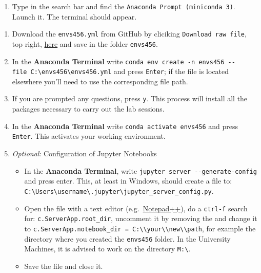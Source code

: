 \documentclass[
  letterpaper,
  DIV=11,
  numbers=noendperiod]{scrreprt}
\providecommand{\tightlist}{%
  \setlength{\itemsep}{0pt}\setlength{\parskip}{0pt}}\usepackage{longtable,booktabs,array}
\begin{document}
\begin{enumerate}
\def\labelenumi{\arabic{enumi}.}
\tightlist
\item
  Type in the search bar and find the
  \texttt{Anaconda\ Prompt\ (miniconda\ 3)}. Launch it. The terminal
  should appear.
\end{enumerate}

\begin{enumerate}
\def\labelenumi{\arabic{enumi}.}
\setcounter{enumi}{1}
\tightlist
\item
  Download the \texttt{envs456.yml} from GitHub by cliciking
  \texttt{Download\ raw\ file}, top right,
  \href{https://github.com/GDSL-UL/wma/blob/main/envs456.yml}{here} and
  save in the folder \texttt{envs456}.
\item
  In the \textbf{Anaconda Terminal} write
  \texttt{conda\ env\ create\ -n\ envs456\ -\/-file\ C:\textbackslash{}envs456\textbackslash{}envs456.yml}
  and press \texttt{Enter}; if the file is located elsewhere you'll need
  to use the corresponding file path.
\item
  If you are prompted any questions, press \texttt{y}. This process will
  install all the packages necessary to carry out the lab sessions.
\item
  In the \textbf{Anaconda Terminal} write
  \texttt{conda\ activate\ envs456} and press \texttt{Enter}. This
  activates your working environment.
\item
  \emph{Optional}: Configuration of Jupyter Notebooks

  \begin{itemize}
  \tightlist
  \item
    In the \textbf{Anaconda Terminal}, write
    \texttt{jupyter\ server\ -\/-generate-config} and press enter. This,
    at least in Windows, should create a file to:
    \texttt{C:\textbackslash{}Users\textbackslash{}username\textbackslash{}.jupyter\textbackslash{}jupyter\_server\_config.py}.
  \item
    Open the file with a text editor
    (e.g.~\href{https://notepad-plus-plus.org}{Notepad++}), do a
    \texttt{ctrl-f} search for: \texttt{c.ServerApp.root\_dir},
    uncomment it by removing the and change it to
    \texttt{c.ServerApp.notebook\_dir\ =\ \textquotesingle{}C:\textbackslash{}\textbackslash{}your\textbackslash{}\textbackslash{}new\textbackslash{}\textbackslash{}path},
    for example the directory where you created the \texttt{envs456}
    folder. In the University Machines, it is advised to work on the
    directory \texttt{M:\textbackslash{}}.
  \item
    Save the file and close it.
  \end{itemize}
\end{enumerate}
\end{document}
